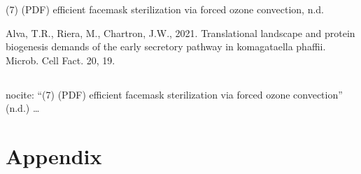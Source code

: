 \documentclass[12pt,oneside]{ucrthesis}
\newlength{\cslhangindent}
\newenvironment{CSLReferences}[2] %
 {%
  \setlength{\parindent}{0pt}
  \ifodd #1 \everypar{\setlength{\hangindent}{\cslhangindent}}\ignorespaces\fi
  \ifnum #2 > 0
  \setlength{\parskip}{#2\baselineskip}
  \fi
 }%
 {}
\begin{document}

\hypertarget{refs}{}
\begin{CSLReferences}{1}{0}
\leavevmode{}%
(7) ({PDF}) efficient facemask sterilization via forced ozone convection, n.d.

\leavevmode{}%
Alva, T.R., Riera, M., Chartron, J.W., 2021. Translational landscape and protein biogenesis demands of the early secretory pathway in komagataella phaffii. Microb. Cell Fact. 20, 19.

\end{CSLReferences}
\noindent

\hypertarget{section}{%
\section{}\label{section}}

nocite: \textbar{}
{``(7) ({PDF}) efficient facemask sterilization via forced ozone convection''} (n.d.)
\ldots{}

\hypertarget{appendix}{%
\chapter*{Appendix}\label{appendix}}


\end{document}

